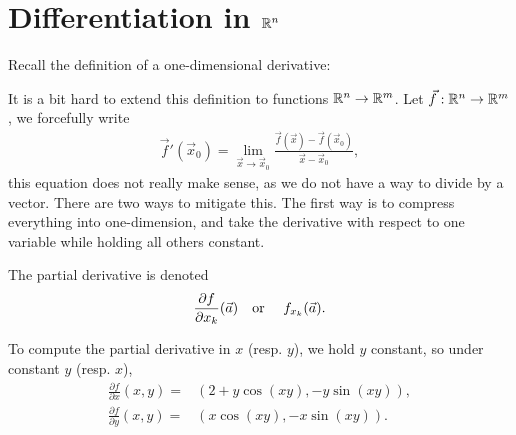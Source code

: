 \section{Differentiation in $\mathbb{R}^n$}

Recall the definition of a one-dimensional derivative: 

It is a bit hard to extend this definition to functions $\mathbb{R}^n\to\mathbb{R}^m$. Let $\vec{f}:\mathbb{R}^n\to\mathbb{R}^m$, we forcefully write \begin{align*}
    \vec{f}'(\vec{x}_0) =\lim_{\vec{x}\to\vec{x}_0}\frac{\vec{f}(\vec{x})-\vec{f}(\vec{x}_0)}{\vec{x}-\vec{x}_0},
\end{align*}
this equation does not really make sense, as we do not have a way to divide by a vector.
There are two ways to mitigate this. The first way is to compress everything into one-dimension, and take the derivative with respect to one variable while holding all others constant.
\begin{notation}
The partial derivative is denoted \[
\frac{\partial f}{\partial x_k}(\vec{a})\textrm{\quad or \quad }f_{x_k}(\vec{a}).
\]
\end{notation}

To compute the partial derivative in $x$ (resp. $y$), we hold $y$ constant, so under constant $y$ (resp. $x$), \begin{align*}
    \frac{\partial f}{\partial x} (x,y) =& (2+y\cos(xy), -y\sin (xy)),\\
    \frac{\partial f}{\partial y} (x,y) =& (x\cos(xy),-x\sin(xy)).
\end{align*}

